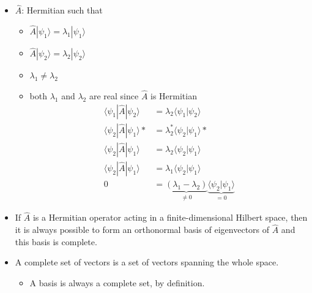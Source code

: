 \documentclass[a4paper,11pt,normalem]{article}
\begin{document}
\begin{itemize}
\item
  \(\hat{A}\): Hermitian such that
  \begin{itemize}
  \item
    \(\hat{A}|\psi_1\rangle = \lambda_1|\psi_1\rangle\)
  \item
    \(\hat{A}|\psi_2\rangle = \lambda_2|\psi_2\rangle\)
  \item
    \(\lambda_1 \neq \lambda_2\)
  \item
    both \(\lambda_1\) and \(\lambda_2\) are real since \(\hat{A}\) is
    Hermitian
\[
    \begin{aligned}
    \langle\psi_1|\hat{A}|\psi_2\rangle &= \lambda_2\langle\psi_1|\psi_2\rangle \\
    \langle\psi_2|\hat{A}|\psi_1\rangle * &= \lambda_2^* \langle\psi_2|\psi_1\rangle * \\
    \langle\psi_2|\hat{A}|\psi_1\rangle &= \lambda_2\langle\psi_2|\psi_1\rangle \\
    \langle\psi_2|\hat{A}|\psi_1\rangle &= \lambda_1\langle\psi_2|\psi_1\rangle \\
    0 &= \underbrace{(\lambda_1 - \lambda_2)}_{\neq 0}\underbrace{\langle\psi_2|\psi_1\rangle}_{=0}
    \end{aligned}
\]
  \end{itemize}
\item
  If \(\hat{A}\) is a Hermitian operator acting in a finite-dimensional
  Hilbert space, then it is always possible to form an orthonormal basis
  of eigenvectors of \(\hat{A}\) and this basis is complete.
\item
  A complete set of vectors is a set of vectors spanning the whole
  space.
  \begin{itemize}
  \item
    A basis is always a complete set, by definition.
  \end{itemize}
\end{itemize}
\end{document}
